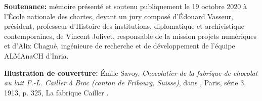 \bigbreak

\textbf{Soutenance:} mémoire présenté et soutenu publiquement le 19 octobre 2020 à l'École nationale des chartes, devant un jury composé d'Édouard Vasseur, président, professeur d’Histoire des institutions, diplomatique et archivistique contemporaines, de Vincent Jolivet, responsable de la mission projets numériques et d'Alix Chagué, ingénieure de recherche et de développement de l’équipe ALMAnaCH d’Inria.

\bigbreak

\bigbreak

\textbf{Illustration de couverture:} Émile Savoy, \textit{Chocolatier de la fabrique de chocolat au lait F.-L. Cailler à Broc (canton de Fribourg, Suisse)}, dans \lodm, Paris, série 3, 1913, p. 325, \og La fabrique Cailler \fg.
